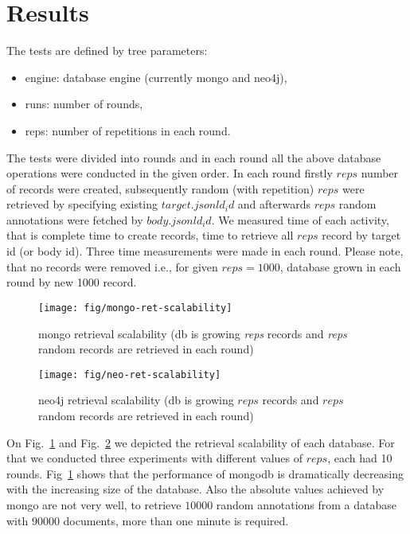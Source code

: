 \documentclass[a4paper,10pt]{article}
\begin{document}
\section{Results}
The tests are defined by tree parameters:
\begin{itemize}
 \item engine: database engine (currently mongo and neo4j),
 \item runs: number of rounds, 
 \item reps: number of repetitions in each round.
\end{itemize}

The tests were divided into rounds and in each round all the above database operations were 
conducted in the given order. In each round firstly $reps$ number of records were 
created, subsequently random (with repetition) $reps$ were retrieved by 
specifying existing $target.jsonld_id$ and afterwards $reps$ random annotations 
were fetched by $body.jsonld_id$. We measured time of each activity, that is 
complete time to create records, time to retrieve all $reps$ record by target id 
(or body id). Three time measurements were made in each round. Please note, that 
no records were removed i.e., for given $reps = 1000$, database grown in each round 
by new 1000 record. 


\begin{figure}
\centering
 \texttt{[image: fig/mongo-ret-scalability]} 
 \caption{mongo retrieval scalability (db is growing \emph{reps} records and \emph{reps} random records are retrieved in each round)} \label{fig:mongo-ret}
\end{figure}


\begin{figure}
\centering
 \texttt{[image: fig/neo-ret-scalability]}
 \caption{neo4j retrieval scalability (db is growing $reps$ records and $reps$ random records are retrieved in each round)} \label{fig:neo-ret}
\end{figure}

On Fig.~\ref{fig:mongo-ret} and Fig.~\ref{fig:neo-ret} we depicted the retrieval scalability 
of each database. For that we conducted three experiments with different values of $reps$, each 
had 10 rounds. Fig~\ref{fig:mongo-ret} shows that the performance of mongodb is 
dramatically decreasing with the increasing size of the database. Also the absolute values 
achieved by mongo are not very well, to retrieve $10000$ random annotations from a database 
with $90 000$ documents, more than one minute is required. 
\end{document}
